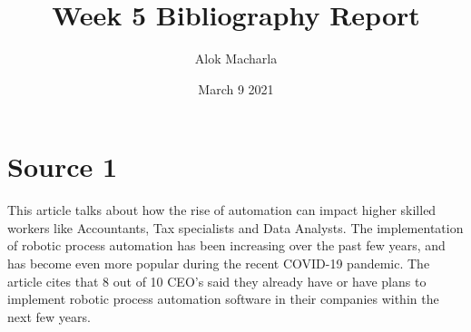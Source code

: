 \documentclass{article}
\title{Week 5 Bibliography Report}
\author{Alok Macharla}
\date{March 9 2021}
\begin{document}
\maketitle

\section{Source 1}
This article talks about how the rise of automation can impact higher skilled workers like Accountants, Tax specialists and Data Analysts. The implementation of robotic process automation has been increasing over the past few years, and has become even more popular during the recent COVID-19 pandemic. The article cites that 8 out of 10 CEO's said they already have or have plans to implement robotic process automation software in their companies within the next few years. \cite{roose_2021}



\end{document}
